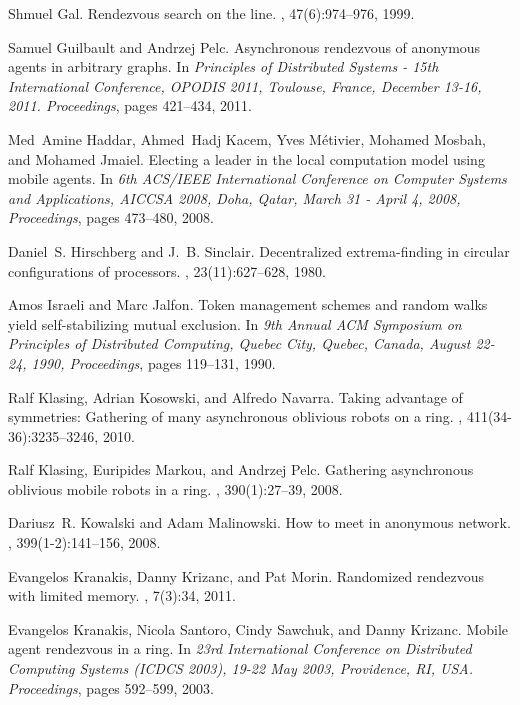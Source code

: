 \documentclass[11pt]{article}
\begin{document}
\begin{thebibliography}{10}
Shmuel Gal.
\newblock Rendezvous search on the line.
, 47(6):974--976, 1999.

Samuel Guilbault and Andrzej Pelc.
\newblock Asynchronous rendezvous of anonymous agents in arbitrary graphs.
\newblock In {\em Principles of Distributed Systems - 15th International
  Conference, {OPODIS} 2011, Toulouse, France, December 13-16, 2011.
  Proceedings}, pages 421--434, 2011.

Med~Amine Haddar, Ahmed~Hadj Kacem, Yves M{\'{e}}tivier, Mohamed Mosbah, and
  Mohamed Jmaiel.
\newblock Electing a leader in the local computation model using mobile agents.
\newblock In {\em  6th {ACS/IEEE} International Conference on Computer
  Systems and Applications, {AICCSA} 2008, Doha, Qatar, March 31 - April 4,
  2008, Proceedings}, pages 473--480, 2008.


Daniel~S. Hirschberg and J.~B. Sinclair.
\newblock Decentralized extrema-finding in circular configurations of
  processors.
, 23(11):627--628, 1980.



Amos Israeli and Marc Jalfon.
\newblock Token management schemes and random walks yield self-stabilizing
  mutual exclusion.
\newblock In {\em 9th Annual {ACM} Symposium on Principles
  of Distributed Computing, Quebec City, Quebec, Canada, August 22-24, 1990, Proceedings}, pages 119--131, 1990.

  
Ralf Klasing, Adrian Kosowski, and Alfredo Navarra.
\newblock Taking advantage of symmetries: Gathering of many asynchronous
  oblivious robots on a ring.
, 411(34-36):3235--3246, 2010.

Ralf Klasing, Euripides Markou, and Andrzej Pelc.
\newblock Gathering asynchronous oblivious mobile robots in a ring.
, 390(1):27--39, 2008.
 
  
Dariusz~R. Kowalski and Adam Malinowski.
\newblock How to meet in anonymous network.
, 399(1-2):141--156, 2008.

Evangelos Kranakis, Danny Krizanc, and Pat Morin.
\newblock Randomized rendezvous with limited memory.
, 7(3):34, 2011.

Evangelos Kranakis, Nicola Santoro, Cindy Sawchuk, and Danny Krizanc.
\newblock Mobile agent rendezvous in a ring.
\newblock In {\em 23rd International Conference on Distributed Computing
  Systems {(ICDCS} 2003), 19-22 May 2003, Providence, RI, {USA}. Proceedings}, pages
  592--599, 2003.
  

\end{thebibliography}
\end{document}
